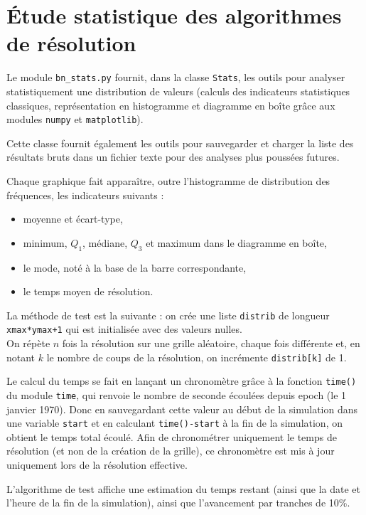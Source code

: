 \chapter{Étude statistique des algorithmes de résolution}\label{annexe_stats}
Le module \texttt{bn\_stats.py} fournit, dans la classe \texttt{Stats}, les outils pour analyser statistiquement une distribution de valeurs (calculs des indicateurs statistiques classiques, représentation en histogramme et diagramme en boîte grâce aux modules \texttt{numpy} et \texttt{matplotlib}).

Cette classe fournit également les outils pour sauvegarder et charger la liste des résultats bruts dans un fichier texte pour des analyses plus poussées futures.

Chaque graphique fait apparaître, outre l'histogramme de distribution des fréquences, les indicateurs suivants :
\begin{itemize}
\item moyenne et écart-type,
\item minimum, $Q_1$, médiane, $Q_3$ et maximum dans le diagramme en boîte,
\item le mode, noté à la base de la barre correspondante,
\item le temps moyen de résolution.
\end{itemize}

\medskip

La méthode de test est la suivante : on crée une liste \texttt{distrib} de longueur \texttt{xmax*ymax+1} qui est initialisée avec des valeurs nulles.\\
On répète $n$ fois la résolution sur une grille aléatoire, chaque fois différente et, en notant $k$ le nombre de coups de la résolution, on incrémente \texttt{distrib[k]} de 1.

\medskip

Le calcul du temps se fait en lançant un chronomètre grâce à la fonction \texttt{time()} du module \texttt{time}, qui renvoie le nombre de seconde écoulées depuis epoch (le 1 janvier 1970). Donc en sauvegardant cette valeur au début de la simulation dans une variable \texttt{start} et en calculant \texttt{time()-start} à la fin de la simulation, on obtient le temps total écoulé. Afin de chronométrer uniquement le temps de résolution (et non de la création de la grille), ce chronomètre est mis à jour uniquement lors de la résolution effective.

L'algorithme de test affiche une estimation du temps restant (ainsi que la date et l'heure de la fin de la simulation), ainsi que l'avancement par tranches de 10\%.

